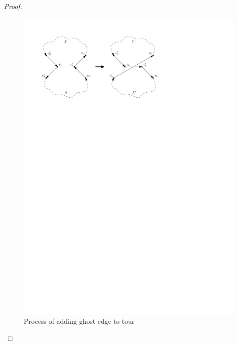 \documentclass{article}
\begin{document}
\begin{proof}
\begin{itemize}
        \begin{figure}
            \centering
            \includegraphics{Assignment3/figures.pdf}
            \caption{Process of adding ghost edge to tour}
            \label{fig:no_ghost}
        \end{figure}


\end{itemize}
\end{proof}
\end{document}
